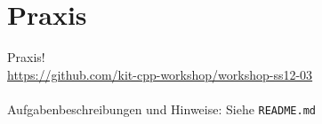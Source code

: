 \section{Praxis}
\begin{frame}[fragile]{Praxis!}
	\ \\
	\large{\url{https://github.com/kit-cpp-workshop/workshop-ss12-03}} \\
	\ \\
	Aufgabenbeschreibungen und Hinweise: Siehe \verb|README.md|

\end{frame}
